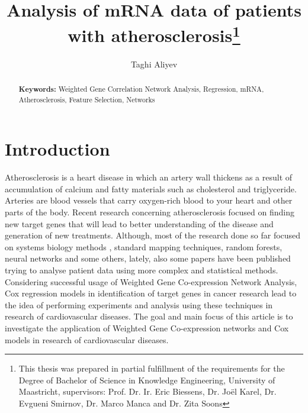 \documentclass{ba-kecs}
\numberwithin{figure}{section}
\numberwithin{equation}{section}
\begin{document}
\title{Analysis of mRNA data of patients with atherosclerosis\footnote{This thesis was prepared in partial fulfillment of the requirements
 for the Degree of Bachelor of Science in Knowledge Engineering,
University of Maastricht,  supervisors: Prof. Dr. Ir. Eric Biessens, Dr. Jo\"{e}l Karel, Dr. Evgueni Smirnov, Dr. Marco Manca and Dr. Zita Soons}}
\author{Taghi Aliyev \\}
\maketitle

\makeatletter
\let\ps@oldempty\ps@empty %
\renewcommand\ps@empty\ps@plain
\makeatother


\begin{abstract}

\smallskip
\noindent \textbf{Keywords: } Weighted Gene Correlation Network Analysis, Regression, mRNA, Atherosclerosis, Feature Selection, Networks
\end{abstract}


\section{Introduction}
Atherosclerosis is a heart disease in which an artery wall thickens as a result of accumulation of calcium and fatty materials such as cholesterol and triglyceride. Arteries are blood vessels that carry oxygen-rich blood to your heart and other parts of the body. Recent research concerning atherosclerosis focused on finding new target genes that will lead to better understanding of the disease and generation of new treatments. Although, most of the research done so far focused on systems biology methods \cite{systems}, standard mapping techniques, random forests, neural networks and some others, lately, also some papers have been published trying to analyse patient data using more complex and statistical methods. Considering successful usage of Weighted Gene Co-expression Network Analysis, Cox regression models in identification of target genes in cancer research\cite{wgcna2,cox2,netcox} lead to the idea of performing experiments and analysis using these techniques in research of cardiovascular diseases. The goal and main focus of this article is to investigate the application of Weighted Gene Co-expression networks and Cox models in research of cardiovascular diseases.
\end{document}
